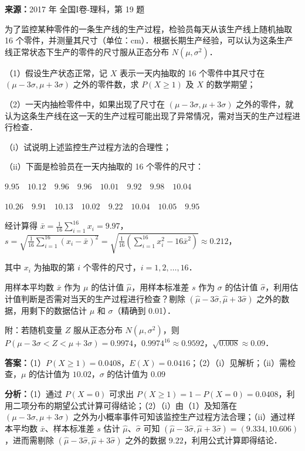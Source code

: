 \begin{question}[points=12]
\textbf{来源：}2017 年 全国I卷-理科，第 19 题\par
为了监控某种零件的一条生产线的生产过程，检验员每天从该生产线上随机抽取 16 个零件，并测量其尺寸（单位：cm）．根据长期生产经验，可以认为这条生产线正常状态下生产的零件的尺寸服从正态分布 $N(\mu,\sigma^2)$．

（1）假设生产状态正常，记 $X$ 表示一天内抽取的 16 个零件中其尺寸在 $(\mu-3\sigma,\mu+3\sigma)$ 之外的零件数，求 $P(X\geq 1)$ 及 $X$ 的数学期望；

（2）一天内抽检零件中，如果出现了尺寸在 $(\mu-3\sigma,\mu+3\sigma)$ 之外的零件，就认为这条生产线在这一天的生产过程可能出现了异常情况，需对当天的生产过程进行检查．

（$\text{i}$）试说明上述监控生产过程方法的合理性；

（$\text{ii}$）下面是检验员在一天内抽取的 16 个零件的尺寸：



$9.95\quad 10.12\quad 9.96\quad 9.96\quad 10.01\quad 9.92\quad 9.98\quad 10.04$



$10.26\quad 9.91\quad 10.13\quad 10.02\quad 9.22\quad 10.04\quad 10.05\quad 9.95$



经计算得 $\bar{x}=\frac{1}{16}\sum_{i=1}^{16}x_i=9.97$，$s=\sqrt{\frac{1}{16}\sum_{i=1}^{16}(x_i-\bar{x})^2}=\sqrt{\frac{1}{16}(\sum_{i=1}^{16}x_i^2-16\bar{x}^2)}\approx0.212$，

其中 $x_i$ 为抽取的第 $i$ 个零件的尺寸，$i=1,2,\ldots,16$．



用样本平均数 $\bar{x}$ 作为 $\mu$ 的估计值 $\hat{\mu}$，用样本标准差 $s$ 作为 $\sigma$ 的估计值 $\hat{\sigma}$，利用估计值判断是否需对当天的生产过程进行检查？剔除 $(\hat{\mu}-3\hat{\sigma},\hat{\mu}+3\hat{\sigma})$ 之外的数据，用剩下的数据估计 $\mu$ 和 $\sigma$（精确到 0.01）．

附：若随机变量 $Z$ 服从正态分布 $N(\mu,\sigma^2)$，则 $P(\mu-3\sigma<Z<\mu+3\sigma)=0.9974$，$0.9974^{16}\approx0.9592$，$\sqrt{0.008}\approx0.09$．
\begin{solution}
\textbf{答案：}（1）$P(X\geq1)=0.0408$，$E(X)=0.0416$；（2）（$\text{i}$）见解析；（$\text{ii}$）需检查，$\mu$ 的估计值为 $10.02$，$\sigma$ 的估计值为 $0.09$

\textbf{分析：}（1）通过 $P(X=0)$ 可求出 $P(X\geq1)=1-P(X=0)=0.0408$，利用二项分布的期望公式计算可得结论；（2）（$\text{i}$）由（1）及知落在 $(\mu-3\sigma,\mu+3\sigma)$ 之外为小概率事件可知该监控生产过程方法合理；（$\text{ii}$）通过样本平均数 $\bar{x}$、样本标准差 $s$ 估计 $\hat{\mu}$、$\hat{\sigma}$ 可知 $(\hat{\mu}-3\hat{\sigma},\hat{\mu}+3\hat{\sigma})=(9.334,10.606)$，进而需剔除 $(\hat{\mu}-3\hat{\sigma},\hat{\mu}+3\hat{\sigma})$ 之外的数据 $9.22$，利用公式计算即得结论．


\end{solution}
\end{question}
